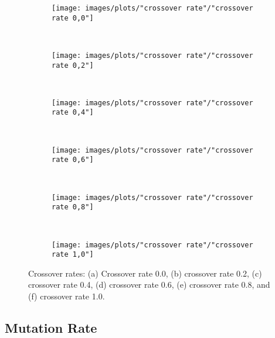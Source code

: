 \begin{figure}[h!]
    \centering
    \begin{subfigure}[b]{0.31\textwidth}
        \texttt{[image: images/plots/"crossover rate"/"crossover rate 0,0"]}
        \caption{}
        \hfill
        \label{plot:crossover rate 0.0}
    \end{subfigure}
    ~
    \begin{subfigure}[b]{0.31\textwidth}
        \texttt{[image: images/plots/"crossover rate"/"crossover rate 0,2"]}
        \caption{}
        \hfill
        \label{plot:two point crossover}
    \end{subfigure}
    ~
       \begin{subfigure}[b]{0.31\textwidth}
        \texttt{[image: images/plots/"crossover rate"/"crossover rate 0,4"]}
        \caption{}
        \hfill
        \label{plot:two point crossover}
    \end{subfigure}
    ~
       \begin{subfigure}[b]{0.31\textwidth}
        \texttt{[image: images/plots/"crossover rate"/"crossover rate 0,6"]}
        \caption{}
        \hfill
        \label{plot:two point crossover}
    \end{subfigure}
    ~
       \begin{subfigure}[b]{0.31\textwidth}
        \texttt{[image: images/plots/"crossover rate"/"crossover rate 0,8"]}
        \caption{}
        \hfill
        \label{plot:two point crossover}
    \end{subfigure}
    ~
    \begin{subfigure}[b]{0.31\textwidth}
        \texttt{[image: images/plots/"crossover rate"/"crossover rate 1,0"]}
        \caption{}
        \hfill
        \label{plot:uniform crossover}
    \end{subfigure}
    \caption{Crossover rates: (a) Crossover rate 0.0, (b) crossover rate 0.2, (c) crossover rate 0.4, (d) crossover rate 0.6, (e) crossover rate 0.8, and (f) crossover rate 1.0.}
    \label{plot:crossover methods}
\end{figure}


\subsection{Mutation Rate}


